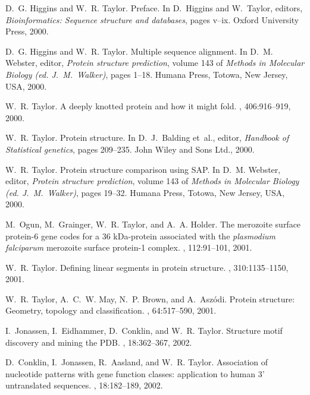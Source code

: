 \begin{thebibliography}{100}
D.~G. Higgins and W.~R. Taylor.
\newblock Preface.
\newblock In D.~Higgins and W.~Taylor, editors, {\em Bioinformatics: Sequence
  structure and databases}, pages v--ix. Oxford University Press, 2000.

D.~G. Higgins and W.~R. Taylor.
\newblock Multiple sequence alignment.
\newblock In D.~M. Webster, editor, {\em Protein structure prediction}, volume
  143 of {\em Methods in Molecular Biology (ed. J.~M.~Walker)}, pages 1--18.
  Humana Press, Totowa, New Jersey, USA, 2000.

W.~R. Taylor.
\newblock A deeply knotted protein and how it might fold.
, 406:916--919, 2000.

W.~R. Taylor.
\newblock Protein structure.
\newblock In D.~J.~Balding et~al., editor, {\em Handbook of Statistical
  genetics}, pages 209--235. John Wiley and Sons Ltd., 2000.

W.~R. Taylor.
\newblock Protein structure comparison using {SAP}.
\newblock In D.~M. Webster, editor, {\em Protein structure prediction}, volume
  143 of {\em Methods in Molecular Biology (ed. J.~M.~Walker)}, pages 19--32.
  Humana Press, Totowa, New Jersey, USA, 2000.

M.~Ogun, M.~Grainger, W.~R. Taylor, and A.~A. Holder.
\newblock The merozoite surface protein-6 gene codes for a 36 {kDa}-protein
  associated with the {\em plasmodium falciparum} merozoite surface protein-1
  complex.
, 112:91--101, 2001.

W.~R. Taylor.
\newblock Defining linear segments in protein structure.
, 310:1135--1150, 2001.

W.~R. Taylor, A.~C.~W. May, N.~P. Brown, and A.~Asz\'odi.
\newblock Protein structure: Geometry, topology and classification.
, 64:517--590, 2001.

I.~Jonassen, I.~Eidhammer, D.~Conklin, and W.~R. Taylor.
\newblock Structure motif discovery and mining the {PDB}.
, 18:362--367, 2002.

D.~Conklin, I.~Jonassen, R.~Aasland, and W.~R. Taylor.
\newblock Association of nucleotide patterns with gene function classes:
  application to human 3' untranslated sequences.
, 18:182--189, 2002.


\end{thebibliography}
